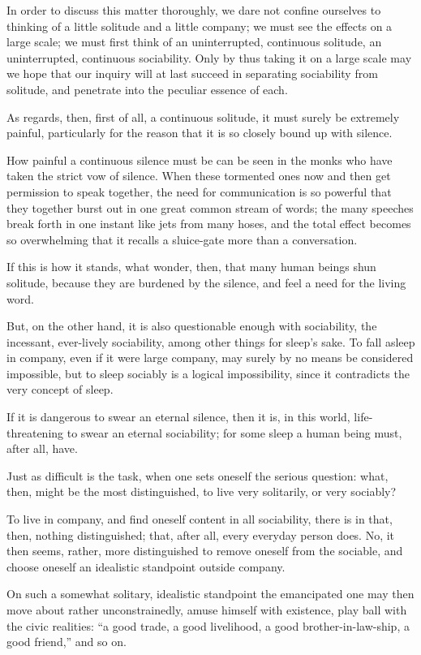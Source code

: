 \documentclass[12pt,a4paper]{book}
\begin{document}
In order to discuss this matter thoroughly, we dare not confine ourselves to thinking of a little solitude and a little company; we must see the effects on a large scale; we must first think of an uninterrupted, continuous solitude, an uninterrupted, continuous sociability. Only by thus taking it on a large scale may we hope that our inquiry will at last succeed in separating sociability from solitude, and penetrate into the peculiar essence of each.

As regards, then, first of all, a continuous solitude, it must surely be extremely painful, particularly for the reason that it is so closely bound up with silence.

How painful a continuous silence must be can be seen in the monks who have taken the strict vow of silence. When these tormented ones now and then get permission to speak together, the need for communication is so powerful that they
together burst out in one great common stream of words; the many speeches break forth in one instant like jets from many hoses, and the total effect becomes so overwhelming that it recalls a sluice-gate more than a conversation.

If this is how it stands, what wonder, then, that many human beings shun solitude, because they are burdened by the silence, and feel a need for the living word.

But, on the other hand, it is also questionable enough with sociability, the incessant, ever-lively sociability, among other things for sleep's sake. To fall asleep in company, even if it were large company, may surely by no means be considered impossible, but to sleep sociably is a logical impossibility, since it contradicts the very concept of sleep.

If it is dangerous to swear an eternal silence, then it is, in this world, life-threatening to swear an eternal sociability; for some sleep a human being must, after all, have.

Just as difficult is the task, when one sets oneself the serious question: what, then, might be the most distinguished, to live very solitarily, or very sociably?

To live in company, and find oneself content in all sociability, there is in that, then, nothing distinguished; that, after all, every everyday person does. No, it then seems, rather, more distinguished to remove oneself from the sociable, and choose oneself an idealistic standpoint outside company.

On such a somewhat solitary, idealistic standpoint the emancipated one may then move about rather unconstrainedly, amuse himself with existence, play ball with the civic realities: ``a good trade, a good livelihood, a good brother-in-law-ship, a good friend,'' and so on.
\end{document}
